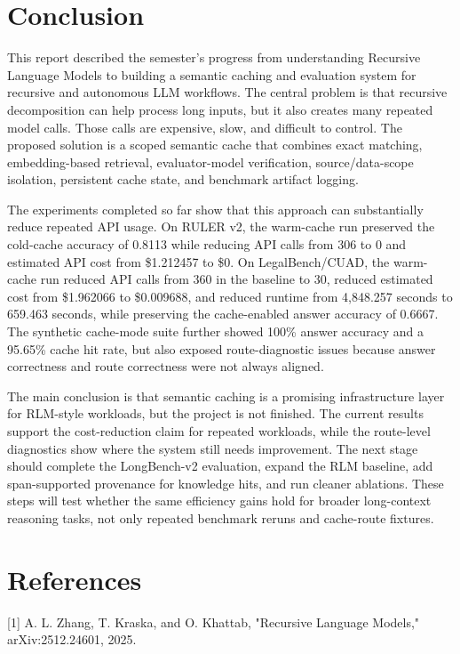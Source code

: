 \documentclass[10pt,a4paper]{article}
\begin{document}
\section{Conclusion}

This report described the semester's progress from understanding Recursive Language Models to building a semantic caching and evaluation system for recursive and autonomous LLM workflows. The central problem is that recursive decomposition can help process long inputs, but it also creates many repeated model calls. Those calls are expensive, slow, and difficult to control. The proposed solution is a scoped semantic cache that combines exact matching, embedding-based retrieval, evaluator-model verification, source/data-scope isolation, persistent cache state, and benchmark artifact logging.

The experiments completed so far show that this approach can substantially reduce repeated API usage. On RULER v2, the warm-cache run preserved the cold-cache accuracy of 0.8113 while reducing API calls from 306 to 0 and estimated API cost from \$1.212457 to \$0. On LegalBench/CUAD, the warm-cache run reduced API calls from 360 in the baseline to 30, reduced estimated cost from \$1.962066 to \$0.009688, and reduced runtime from 4,848.257 seconds to 659.463 seconds, while preserving the cache-enabled answer accuracy of 0.6667. The synthetic cache-mode suite further showed 100\% answer accuracy and a 95.65\% cache hit rate, but also exposed route-diagnostic issues because answer correctness and route correctness were not always aligned.

The main conclusion is that semantic caching is a promising infrastructure layer for RLM-style workloads, but the project is not finished. The current results support the cost-reduction claim for repeated workloads, while the route-level diagnostics show where the system still needs improvement. The next stage should complete the LongBench-v2 evaluation, expand the RLM baseline, add span-supported provenance for knowledge hits, and run cleaner ablations. These steps will test whether the same efficiency gains hold for broader long-context reasoning tasks, not only repeated benchmark reruns and cache-route fixtures.

\section{References}

[1] A. L. Zhang, T. Kraska, and O. Khattab, "Recursive Language Models," arXiv:2512.24601, 2025.
\end{document}
